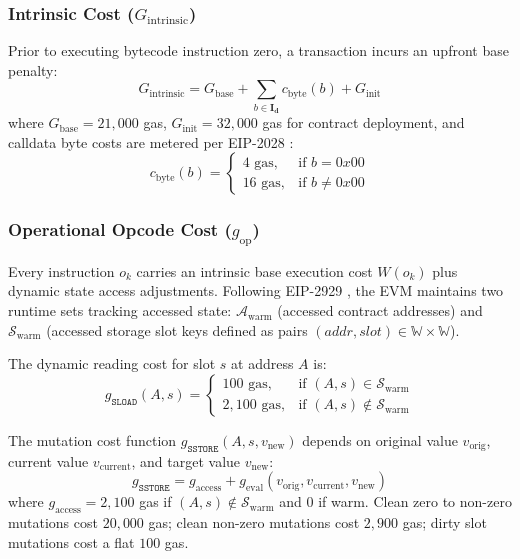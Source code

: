 \documentclass[conference]{IEEEtran}
\begin{document}
\subsubsection{Intrinsic Cost ($G_{\text{intrinsic}}$)}
Prior to executing bytecode instruction zero, a transaction incurs an upfront base penalty:
\begin{equation}
G_{\text{intrinsic}} = G_{\text{base}} + \sum_{b \in \mathbf{I}_{\mathbf{d}}} c_{\text{byte}}(b) + G_{\text{init}}
\end{equation}
where $G_{\text{base}} = 21,000$ gas, $G_{\text{init}} = 32,000$ gas for contract deployment, and calldata byte costs are metered per EIP-2028 \cite{eip2028}:
\begin{equation}
c_{\text{byte}}(b) = \begin{cases} 4 \text{ gas}, & \text{if } b = 0x00 \\ 16 \text{ gas}, & \text{if } b \ne 0x00 \end{cases}
\end{equation}

\subsubsection{Operational Opcode Cost ($g_{\text{op}}$)}
Every instruction $o_k$ carries an intrinsic base execution cost $W(o_k)$ plus dynamic state access adjustments. Following EIP-2929 \cite{eip2929}, the EVM maintains two runtime sets tracking accessed state: $\mathcal{A}_{\text{warm}}$ (accessed contract addresses) and $\mathcal{S}_{\text{warm}}$ (accessed storage slot keys defined as pairs $(addr, slot) \in \mathbb{W} \times \mathbb{W}$).

The dynamic reading cost for slot $s$ at address $A$ is:
\begin{equation}
g_{\texttt{SLOAD}}(A, s) = \begin{cases} 100 \text{ gas}, & \text{if } (A, s) \in \mathcal{S}_{\text{warm}} \\ 2,100 \text{ gas}, & \text{if } (A, s) \notin \mathcal{S}_{\text{warm}} \end{cases}
\end{equation}

The mutation cost function $g_{\texttt{SSTORE}}(A, s, v_{\text{new}})$ depends on original value $v_{\text{orig}}$, current value $v_{\text{current}}$, and target value $v_{\text{new}}$:
\begin{equation}
g_{\texttt{SSTORE}} = g_{\text{access}} + g_{\text{eval}}(v_{\text{orig}}, v_{\text{current}}, v_{\text{new}})
\end{equation}
where $g_{\text{access}} = 2,100$ gas if $(A, s) \notin \mathcal{S}_{\text{warm}}$ and $0$ if warm. Clean zero to non-zero mutations cost $20,000$ gas; clean non-zero mutations cost $2,900$ gas; dirty slot mutations cost a flat $100$ gas.
\end{document}
